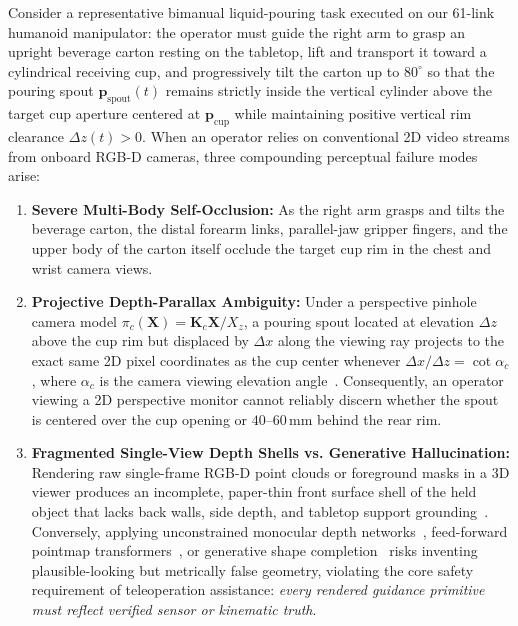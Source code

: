 \documentclass[10pt,journal]{IEEEtran}
\begin{document}
Consider a representative bimanual liquid-pouring task executed on our 61-link humanoid manipulator: the operator must guide the right arm to grasp an upright beverage carton resting on the tabletop, lift and transport it toward a cylindrical receiving cup, and progressively tilt the carton up to $80^\circ$ so that the pouring spout $\mathbf{p}_{\mathrm{spout}}(t)$ remains strictly inside the vertical cylinder above the target cup aperture centered at $\mathbf{p}_{\mathrm{cup}}$ while maintaining positive vertical rim clearance $\Delta z(t) > 0$. When an operator relies on conventional 2D video streams from onboard RGB-D cameras, three compounding perceptual failure modes arise:
\begin{enumerate}
    \item \textbf{Severe Multi-Body Self-Occlusion:} As the right arm grasps and tilts the beverage carton, the distal forearm links, parallel-jaw gripper fingers, and the upper body of the carton itself occlude the target cup rim in the chest and wrist camera views.
    \item \textbf{Projective Depth-Parallax Ambiguity:} Under a perspective pinhole camera model $\pi_c(\mathbf{X}) = \mathbf{K}_c \mathbf{X} / X_z$, a pouring spout located at elevation $\Delta z$ above the cup rim but displaced by $\Delta x$ along the viewing ray projects to the exact same 2D pixel coordinates as the cup center whenever $\Delta x / \Delta z = \cot\alpha_c$, where $\alpha_c$ is the camera viewing elevation angle~\cite{milgram1993argos,hartley2004mvg}. Consequently, an operator viewing a 2D perspective monitor cannot reliably discern whether the spout is centered over the cup opening or $40$--$60\,\mathrm{mm}$ behind the rear rim.
    \item \textbf{Fragmented Single-View Depth Shells vs. Generative Hallucination:} Rendering raw single-frame RGB-D point clouds or foreground masks in a 3D viewer produces an incomplete, paper-thin front surface shell of the held object that lacks back walls, side depth, and tabletop support grounding~\cite{su2021mixed}. Conversely, applying unconstrained monocular depth networks~\cite{yang2024depthv2,wang2025priorda,bochkovskii2025depthpro,piccinelli2024unidepth,piccinelli2025unidepthv2,hu2024metric3dv2,bhat2023zoedepth,ke2024marigold}, feed-forward pointmap transformers~\cite{wang2024dust3r,leroy2024mast3r,wang2025vggt,liu2025slam3r,wang2025cut3r,wang2025spann3r,zhang2025monst3r}, or generative shape completion~\cite{park2019deepsdf,mildenhall2020nerf,kerbl20233dgs} risks inventing plausible-looking but metrically false geometry, violating the core safety requirement of teleoperation assistance: \emph{every rendered guidance primitive must reflect verified sensor or kinematic truth}.
\end{enumerate}
\end{document}
